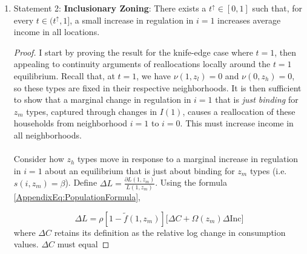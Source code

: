 \documentclass[12pt]{article}
\begin{document}
\begin{enumerate}
\begin{proof}
		 \paragraph*{}
		 To complete the proof, we need to show that $\Delta \text{Inc} > 0$. We know that $\phi^{I}_{z_{h}} > 0$ since the output share of the highest income types is always larger than their fraction of the population. Moreover, $\phi^{I}_{z_{l}} < 0$ for the opposite reason. Since $\Delta \nu(z_{h}) > 0$, $\Delta \nu(z_{h}) < 0$ and $\Delta \nu(z_{m}) = 0$, this is all sufficient to show that $\Delta \text{Inc} > 0$. Hence, neighborhood incomes diverge strictly in $t$. 
		 
		\end{proof}
		
		
		\item Statement 2: \textbf{Inclusionary Zoning}: There exists a $t^{\uparrow} \in [0, 1]$ such that, for every $t \in (t^{\uparrow}, 1]$, a small increase in regulation in $i = 1$ increases average income in all locations.
		
		\begin{proof}
			I start by proving the result for the knife-edge case where $t = 1$, then appealing to continuity arguments of reallocations locally around the $t = 1$ equilibrium. Recall that, at $t = 1$, we have $\nu(1, z_{l}) = 0$ and $\nu(0, z_{h}) = 0$, so these types are fixed in their respective neighborhoods. It is then sufficient to show that a marginal change in regulation in $i = 1$ that is \textit{just binding} for $z_{m}$ types, captured through changes in $I(1)$, causes a reallocation of these households from neighborhood $i = 1$ to $i = 0$. This must increase income in all neighborhoods. 
			
			
			\paragraph*{}
			Consider how $z_{h}$ types move in response to a marginal increase in regulation in $i=1$ about an equilibrium that is just about binding for $z_{m}$ types (i.e. $s(i, z_{m}) = \beta$). Define $\Delta L = \frac{\partial L(1, z_{m})}{L(1, z_{m})}$.  Using the formula \eqref{AppendixEq:PopulationFormula},
			
			\begin{equation*}
					\Delta L = \rho[1 - \tilde{f}(1, z_{m})]\big[ \Delta C + \Omega(z_{m})\Delta \text{Inc} \big]
			\end{equation*}
			where $\Delta C$ retains its definition as the relative log change in consumption values. $\Delta C$ must equal
			

\end{proof}
\end{enumerate}
\end{document}
